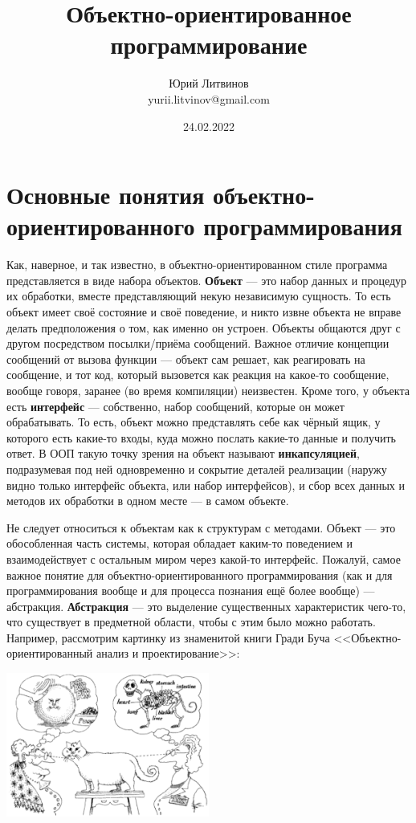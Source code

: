 \documentclass[a5paper]{article}
\title{Объектно-ориентированное программирование}
\author{Юрий Литвинов\\\small{yurii.litvinov@gmail.com}}
\date{24.02.2022}
\begin{document}
\maketitle
\thispagestyle{empty}

\section{Основные понятия объектно-ориентированного программирования}

Как, наверное, и так известно, в объектно-ориентированном стиле программа представляется в виде набора объектов. \textbf{Объект} --- это набор данных и процедур их обработки, вместе представляющий некую независимую сущность. То есть объект имеет своё состояние и своё поведение, и никто извне объекта не вправе делать предположения о том, как именно он устроен. Объекты общаются друг с другом посредством посылки/приёма сообщений. Важное отличие концепции сообщений от вызова функции --- объект сам решает, как реагировать на сообщение, и тот код, который вызовется как реакция на какое-то сообщение, вообще говоря, заранее (во время компиляции) неизвестен. Кроме того, у объекта есть \textbf{интерфейс} --- собственно, набор сообщений, которые он может обрабатывать. То есть, объект можно представлять себе как чёрный ящик, у которого есть какие-то входы, куда можно послать какие-то данные и получить ответ. В ООП такую точку зрения на объект называют \textbf{инкапсуляцией}, подразумевая под ней одновременно и сокрытие деталей реализации (наружу видно только интерфейс объекта, или набор интерфейсов), и сбор всех данных и методов их обработки в одном месте --- в самом объекте.

Не следует относиться к объектам как к структурам с методами. Объект --- это обособленная часть системы, которая обладает каким-то поведением и взаимодействует с остальным миром через какой-то интерфейс. Пожалуй, самое важное понятие для объектно-ориентированного программирования (как и для программирования вообще и для процесса познания ещё более вообще) --- абстракция. \textbf{Абстракция} --- это выделение существенных характеристик чего-то, что существует в предметной области, чтобы с этим было можно работать. Например, рассмотрим картинку из знаменитой книги Гради Буча <<Объектно-ориентированный анализ и проектирование>>:

\begin{center}
    \includegraphics[width=0.5\textwidth]{abstraction.png}
\end{center}
\end{document}
